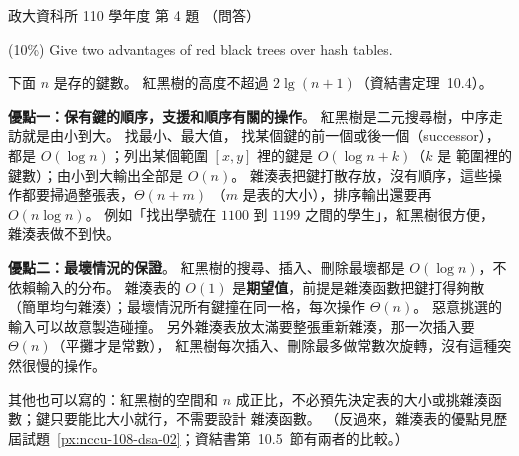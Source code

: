 \begin{pastexam}[label={px:nccu-110-dsa-04}]{政大資科所 110 學年度 第 4 題}
（問答）

(10\%) Give two advantages of red black trees over hash tables.
\end{pastexam}

\begin{pastsoln}
下面 $n$ 是存的鍵數。 紅黑樹的高度不超過 $2\lg(n+1)$（資結書定理~10.4）。

\textbf{優點一：保有鍵的順序，支援和順序有關的操作}。 紅黑樹是二元搜尋樹，中序走訪就是由小到大。 找最小、最大值，
找某個鍵的前一個或後一個（successor），都是 $O(\log n)$；列出某個範圍 $[x, y]$ 裡的鍵是 $O(\log n + k)$（$k$ 是
範圍裡的鍵數）；由小到大輸出全部是 $O(n)$。 雜湊表把鍵打散存放，沒有順序，這些操作都要掃過整張表，$\Theta(n + m)$
（$m$ 是表的大小），排序輸出還要再 $O(n \log n)$。 例如「找出學號在 $1100$ 到 $1199$ 之間的學生」，紅黑樹很方便，
雜湊表做不到快。

\textbf{優點二：最壞情況的保證}。 紅黑樹的搜尋、插入、刪除最壞都是 $O(\log n)$，不依賴輸入的分布。 雜湊表的 $O(1)$
是\textbf{期望值}，前提是雜湊函數把鍵打得夠散（簡單均勻雜湊）；最壞情況所有鍵撞在同一格，每次操作 $\Theta(n)$。
惡意挑選的輸入可以故意製造碰撞。 另外雜湊表放太滿要整張重新雜湊，那一次插入要 $\Theta(n)$（平攤才是常數），
紅黑樹每次插入、刪除最多做常數次旋轉，沒有這種突然很慢的操作。

其他也可以寫的：紅黑樹的空間和 $n$ 成正比，不必預先決定表的大小或挑雜湊函數；鍵只要能比大小就行，不需要設計
雜湊函數。 （反過來，雜湊表的優點見歷屆試題~\ref{px:nccu-108-dsa-02}；資結書第~10.5~節有兩者的比較。）
\end{pastsoln}

